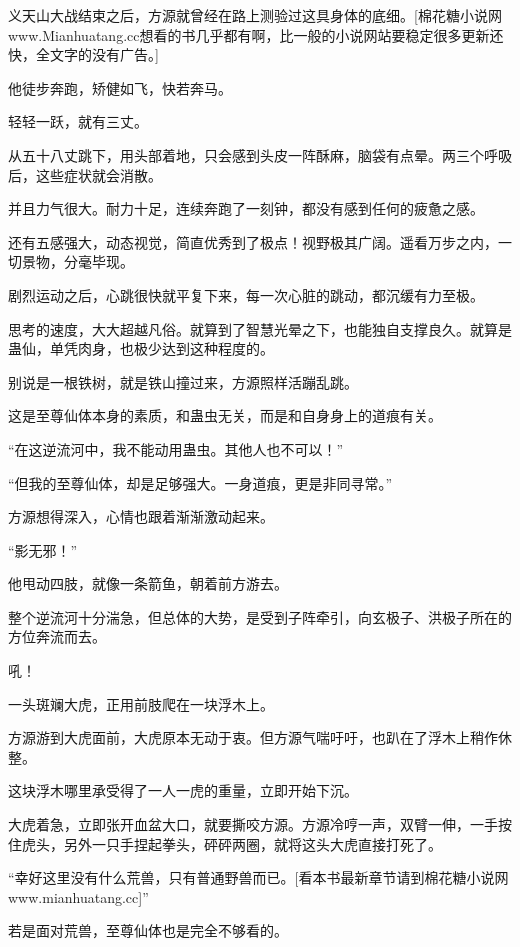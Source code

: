 
\begin{this_body}

义天山大战结束之后，方源就曾经在路上测验过这具身体的底细。[棉花糖小说网www.Mianhuatang.cc想看的书几乎都有啊，比一般的小说网站要稳定很多更新还快，全文字的没有广告。]

他徒步奔跑，矫健如飞，快若奔马。

轻轻一跃，就有三丈。

从五十八丈跳下，用头部着地，只会感到头皮一阵酥麻，脑袋有点晕。两三个呼吸后，这些症状就会消散。

并且力气很大。耐力十足，连续奔跑了一刻钟，都没有感到任何的疲惫之感。

还有五感强大，动态视觉，简直优秀到了极点！视野极其广阔。遥看万步之内，一切景物，分毫毕现。

剧烈运动之后，心跳很快就平复下来，每一次心脏的跳动，都沉缓有力至极。

思考的速度，大大超越凡俗。就算到了智慧光晕之下，也能独自支撑良久。就算是蛊仙，单凭肉身，也极少达到这种程度的。

别说是一根铁树，就是铁山撞过来，方源照样活蹦乱跳。

这是至尊仙体本身的素质，和蛊虫无关，而是和自身身上的道痕有关。

“在这逆流河中，我不能动用蛊虫。其他人也不可以！”

“但我的至尊仙体，却是足够强大。一身道痕，更是非同寻常。”

方源想得深入，心情也跟着渐渐激动起来。

“影无邪！”

他甩动四肢，就像一条箭鱼，朝着前方游去。

整个逆流河十分湍急，但总体的大势，是受到子阵牵引，向玄极子、洪极子所在的方位奔流而去。

吼！

一头斑斓大虎，正用前肢爬在一块浮木上。

方源游到大虎面前，大虎原本无动于衷。但方源气喘吁吁，也趴在了浮木上稍作休整。

这块浮木哪里承受得了一人一虎的重量，立即开始下沉。

大虎着急，立即张开血盆大口，就要撕咬方源。方源冷哼一声，双臂一伸，一手按住虎头，另外一只手捏起拳头，砰砰两圈，就将这头大虎直接打死了。

“幸好这里没有什么荒兽，只有普通野兽而已。[看本书最新章节请到棉花糖小说网www.mianhuatang.cc]”

若是面对荒兽，至尊仙体也是完全不够看的。


\end{this_body}
